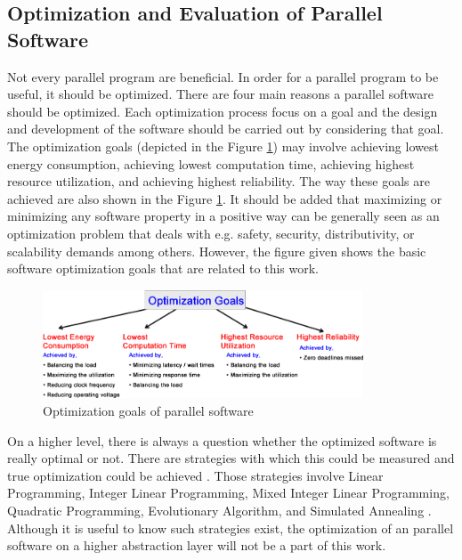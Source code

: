 \subsection{Optimization and Evaluation of Parallel Software} \label{opt}
Not every parallel program are beneficial. In order for a parallel program to be useful, it should be optimized. There are four main reasons a parallel software should be optimized. Each optimization process focus on a goal and the design and development of the software should be carried out by considering that goal. The optimization goals (depicted in the Figure \ref{fig:optimization2})  may involve achieving lowest energy consumption, achieving lowest computation time, achieving highest resource utilization, and achieving highest reliability. The way these goals are achieved are also shown in the Figure \ref{fig:optimization2}. It should be added that maximizing or minimizing any software property in a positive way can be generally seen as an optimization problem that deals with e.g. safety, security, distributivity, or scalability demands among others. However, the figure given shows the basic software optimization goals that are related to this work.

\begin{figure}[!ht]
	\centering
	\includegraphics[width=0.85\textwidth]{content/images/optimization2.png}
	\caption{Optimization goals of parallel software \cite{lukas1}}
	\label{fig:optimization2}
\end{figure}

On a higher level, there is always a question whether the optimized software is really optimal or not. There are strategies with which this could be measured and true optimization could be achieved \cite{lukas1}. Those strategies involve Linear Programming, Integer Linear Programming, Mixed Integer Linear Programming, Quadratic Programming, Evolutionary Algorithm, and Simulated Annealing \cite{lukas1}. Although it is useful to know such strategies exist, the optimization of an parallel software on a higher abstraction layer will not be a part of this work. 

